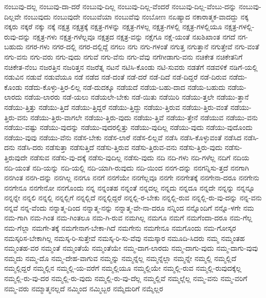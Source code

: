 {ನಂಬುವು-ದಲ್ಲ
ನಂಬುವು-ದಾ-ದರೆ
ನಂಬುವು-ದಿಲ್ಲ
ನಂಬುವು-ದಿಲ್ಲ-ವೆಂದರೆ
ನಂಬುವು-ದಿಲ್ಲ-ವೆಂಬು-ದನ್ನು
ನಂಬುವು-ದಿಲ್ಲವೇ
ನಂಬುವುದು
ನಂಬುವುದೇ
ನಂಬುವೆಯಾ
ನಂಬುವೆವು
ನಂಬೋಣ
ನಏಷ್ಯಾದ
ನಕಾರಾತ್ಮಕ-ವಾದದ್ದು
ನಕ್ಕ
ನಕ್ಕರು
ನಕ್ಕರೆ
ನಕ್ಕು
ನಕ್ಕೆ
ನಕ್ಷತ್ರ
ನಕ್ಷತ್ರಕ್ಕೆ
ನಕ್ಷತ್ರ-ಗಳನ್ನು
ನಕ್ಷತ್ರ-ಗಳಲ್ಲ
ನಕ್ಷತ್ರ-ಗಳಲ್ಲಿ
ನಕ್ಷತ್ರ-ಗಳಲ್ಲಿಯೂ
ನಕ್ಷತ್ರ-ಗಳಲ್ಲಿ-ರುವು-ದನ್ನು
ನಕ್ಷತ್ರ-ಗಳು
ನಕ್ಷತ್ರ-ಗಳೆಲ್ಲವೂ
ನಕ್ಷತ್ರದ
ನಕ್ಷತ್ರ-ವನ್ನು
ನಕ್ಷೆಗೂ
ನಕ್ಷೆ-ಯಂತೆ
ನಖಶಿಖಾಂತ
ನಗದೆ
ನಗ-ಬಹುದು
ನಗರ-ಗಳು
ನಗರ-ದಲ್ಲಿ
ನಗರ-ದಲ್ಲಿದ್ದೆ
ನಗಲು
ನಗು
ನಗು-ಗಳಂತೆ
ನಗುತ್ತ
ನಗುತ್ತಾನೆ
ನಗುತ್ತೇವೆ
ನಗು-ವಂತೆ
ನಗು-ವನು
ನಗು-ವರು
ನಗು-ವುದು
ನಗುವೆ
ನಗು-ವೆನು
ನಗು-ವೆವು
ನಗೆಗೀಡಾಗು-ವನು
ನಚಿಕೇತ
ನಚಿಕೇತನಿಗೆ
ನಚಿಕೇತ-ನೆಂಬ
ನಜರತ್ತಿನ
ನಜರಿತ್ತನ
ನಜರೆತ್ನ
ನಟನೆ
ನಟಿಸಿ-ಕೊಂಡು
ನಟಿ-ಸುವರು
ನಡತೆಗೆ
ನಡವಳಿಕೆ
ನಡಿಗೆ-ಯಲ್ಲಿ
ನಡುವಿನ
ನಡುವೆ
ನಡುವೆಯೂ
ನಡೆ
ನಡೆದ
ನಡೆ-ದಂತೆ
ನಡೆ-ದರೆ
ನಡೆ-ದಿದೆ
ನಡೆ-ದಿದ್ದರೆ
ನಡೆ-ದಿರುವ
ನಡೆದು-ಕೊಂಡು
ನಡೆದು-ಕೊಳ್ಳು-ತ್ತಿರ-ಲಿಲ್ಲ
ನಡೆ-ದುದಕ್ಕೂ
ನಡೆಯದೆ
ನಡೆಯ-ಬಹು-ದಾದ
ನಡೆಯ-ಬಹುದು
ನಡೆಯ-ಲಾರದು
ನಡೆಯ-ಲಾರರು
ನಡೆ-ಯಲು
ನಡೆಯಲೇ-ಬೇಕು
ನಡೆ-ಯಿತು
ನಡೆಯಿರಿ
ನಡೆಯು-ತ್ತಲೇ
ನಡೆಯು-ತ್ತಾನೆ
ನಡೆಯು-ತ್ತಿತ್ತು
ನಡೆಯು-ತ್ತಿದೆ
ನಡೆಯು-ತ್ತಿದ್ದರೆ
ನಡೆಯು-ತ್ತಿದ್ದು
ನಡೆಯು-ತ್ತಿರುವ
ನಡೆಯು-ತ್ತಿರು-ವಂತೆ
ನಡೆಯು-ತ್ತಿರು-ವನು
ನಡೆಯು-ತ್ತಿರು-ವಾಗಲೇ
ನಡೆಯು-ತ್ತಿರು-ವುದು
ನಡೆಯು-ತ್ತಿವೆ
ನಡೆಯು-ತ್ತೇನೆ
ನಡೆಯುವ
ನಡೆಯು-ವನು
ನಡೆಯು-ವಷ್ಟು
ನಡೆಯು-ವುದನ್ನು
ನಡೆಯು-ವುದರಲ್ಲಿತ್ತು
ನಡೆಯು-ವುದಿಲ್ಲ
ನಡೆಯು-ವುದು
ನಡೆಯು-ವುದೊಂದು
ನಡೆಯು-ವುವು
ನಡೆಯು-ವೆನು
ನಡೆಸ-ಬೇಕು
ನಡೆಸ-ಲಾರೆ
ನಡೆಸ-ಲಿಲ್ಲವೆ
ನಡೆಸಿ
ನಡೆಸಿ-ಕೊಳ್ಳುವಂತೆ
ನಡೆಸಿದ
ನಡೆಸಿ-ದನು
ನಡೆಸಿ-ದರು
ನಡೆಸುತ್ತಾ
ನಡೆಸುತ್ತಿದೆ
ನಡೆಸು-ತ್ತಿರುವ
ನಡೆಸು-ತ್ತಿರುವ-ವನು
ನಡೆಸು-ತ್ತಿರು-ವುದು
ನಡೆಸು-ತ್ತಿರುವುದೇ
ನಡೆಸುವ
ನಡೆಸು-ವು-ದಕ್ಕೆ
ನಡೆಸು-ವುದಿಲ್ಲ
ನಡೆಸು-ವುದು
ನದಿ
ನದಿ-ಗಳು
ನದಿ-ಗಳೆಲ್ಲ
ನದಿಗೆ
ನದಿಯ
ನದಿ-ಯಂತೆ
ನದಿ-ಯನ್ನು
ನದಿ-ಯಲ್ಲಿ
ನದಿ-ಯಾಗಿ-ರುವುದು
ನದಿ-ಯಿಂದ
ನನಗ-ದನ್ನು
ನನಗನ್ನಿಸು-ತ್ತದೆ
ನನಗಾಗಿ
ನನಗಿಂತ
ನನಗಿ-ದನ್ನು
ನನಗಿಲ್ಲ
ನನಗೂ
ನನಗೆ
ನನಗೆಯೇ
ನನಗೆಲ್ಲವೂ
ನನಗೇ
ನನಗೇತಕ್ಕೆ
ನನಗೇನಾ-ದರೂ
ನನಗೇನು
ನನಗೇನೂ
ನನಗೇನೋ
ನನಗೊಂದು
ನನ್ನ
ನನ್ನಂತಹ
ನನ್ನಂತೆ
ನನ್ನದಲ್ಲ
ನನ್ನದು
ನನ್ನದೂ
ನನ್ನದೇ
ನನ್ನನ್ನು
ನನ್ನನ್ನೂ
ನನ್ನನ್ನೇ
ನನ್ನಲಿ
ನನ್ನಲ್ಲಿ
ನನ್ನಲ್ಲಿಗೆ
ನನ್ನಲ್ಲಿದೆ
ನನ್ನಲ್ಲಿದ್ದರೆ
ನನ್ನಲ್ಲಿ-ರ-ಬೇಕು
ನನ್ನಲ್ಲಿ-ರುವ
ನನ್ನಲ್ಲಿ-ರು-ವು-ದನ್ನು
ನನ್ನ-ವನು
ನನ್ನವೆ
ನನ್ನ-ವೆಂದು
ನನ್ನಾತ್ಮ-ದಿಂದ
ನನ್ನಾತ್ಮ-ನನ್ನು
ನನ್ನಾತ್ಮ-ವೇ-ನಾ-ದರೂ
ನನ್ನಿಂದ
ನನ್ನೊಂದಿಗೆ
ನನ್ನೊ-ಳಗೇ
ನಮ
ನಮ-ಗಾಗಿ
ನಮ-ಗಿಂತ
ನಮ-ಗಿಂತಲೂ
ನಮ-ಗಿ-ರುವ
ನಮಗಿಲ್ಲ
ನಮಗೂ
ನಮಗೆ
ನಮಗೆಂದಾ-ದರೂ
ನಮ-ಗೆಲ್ಲ
ನಮ-ಗೆಲ್ಲಾ
ನಮಗೇ-ತಕ್ಕೆ
ನಮಗೇನಾಗ-ಬೇಕಾ-ಗಿದೆ
ನಮಗೇನು
ನಮಗೇನೂ
ನಮಗೊಂದು
ನಮ-ಗೋಸ್ಕರ
ನಮಸ್ಕರಿಸ-ಬೇಕಾಗಿಲ್ಲ
ನಮಸ್ಕ-ರಿ-ಸುತ್ತೇವೆ
ನಮಸ್ಕ-ರಿ-ಸು-ವೆವು
ನಮಸ್ಕಾರ
ನಮೂದಿ-ಸಿದರು
ನಮ್ಮ
ನಮ್ಮಂತಹ
ನಮ್ಮಂತಹ-ವರ
ನಮ್ಮಂತೆ
ನಮ್ಮಂತೆಯೆ
ನಮ್ಮಂತೆಯೇ
ನಮ್ಮ-ದಾಗ-ಲಾರದು
ನಮ್ಮ-ದಾಗು-ವುದು
ನಮ್ಮ-ದಾಗು-ವುವು
ನಮ್ಮದು
ನಮ್ಮ-ದೊ
ನಮ್ಮ-ದೇಹ-ವಾಗುವ
ನಮ್ಮನ್ನು
ನಮ್ಮನ್ನೆಲ್ಲ
ನಮ್ಮನ್ನೆಲ್ಲಾ
ನಮ್ಮನ್ನೇ
ನಮ್ಮಲ್ಲಿ
ನಮ್ಮಲ್ಲಿದೆ
ನಮ್ಮಲ್ಲಿದ್ದರೆ
ನಮ್ಮಲ್ಲಿನ
ನಮ್ಮಲ್ಲಿ-ಯ-ವರೆಗೆ
ನಮ್ಮಲ್ಲಿಯೂ
ನಮ್ಮಲ್ಲಿಯೇ
ನಮ್ಮಲ್ಲಿ-ರುವ
ನಮ್ಮಲ್ಲಿ-ರುವುದಕ್ಕೆಲ್ಲ
ನಮ್ಮಲ್ಲಿ-ರು-ವು-ದರ
ನಮ್ಮಲ್ಲಿ-ರು-ವುದು
ನಮ್ಮಲ್ಲಿ-ರು-ವು-ದೆಲ್ಲ
ನಮ್ಮಲ್ಲಿವೆ
ನಮ್ಮಲ್ಲೆಲ್ಲ
ನಮ್ಮ-ವನು
ನಮ್ಮ-ವರಿಗೆ
ನಮ್ಮ-ವರು
ನಮ್ಮಾತ್ಮನಲ್ಲದೆ
ನಮ್ಮಿಂದ
ನಮ್ಮಿಬ್ಬರ
ನಮ್ಮೆದುರಿಗೆ
ನಮ್ಮೆಲ್ಲರ
}
